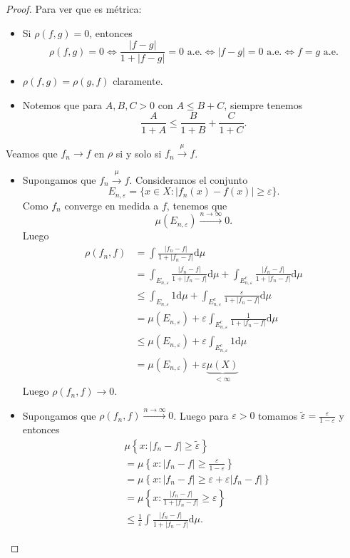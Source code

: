 \documentclass{article}
\theoremstyle{definition}
\theoremstyle{remark}
\numberwithin{equation}{section}
\renewcommand{\d}{\mathrm{d}}
\newcommand{\e}{\varepsilon}
\newcommand{\oo}{\infty}
\renewcommand{\tilde}{\widetilde}
\newcommand{\abs}[1]{\left| #1 \right|}
\newcommand{\set}[1]{\left\{ #1 \right\}}
\newcommand{\ds}{\displaystyle}
\begin{document}
\begin{proof}
  Para ver que es métrica:
  \begin{itemize}
    \item Si $\rho(f,g) = 0$, entonces 
    \[ \rho(f,g) = 0 \iff \frac{\abs{f-g}}{1 + \abs{f-g}} = 0 \text{ a.e.} \iff \abs{f-g} = 0 \text{ a.e.} \iff f = g \text{ a.e.} \]
    \item $\rho(f,g) = \rho(g,f)$ claramente.
    \item Notemos que para $A,B,C >0$ con $A \leq B + C$, siempre tenemos 
    \[ \frac{A}{1+A} \leq \frac{B}{1+B} + \frac{C}{1+C}. \]
  \end{itemize}
  Veamos que $f_n \to f$ en $\rho$ si y solo si $f_n \xrightarrow{\mu} f$.
  \begin{itemize}
    \item \boxed{\impliedby} Supongamos que $f_n \xrightarrow{\mu} f$. Consideramos el conjunto
    \[ E_{n,\e} = \{x \in X \colon \abs{f_n(x) - f(x)} \geq \e\}. \]
    Como $f_n$ converge en medida a $f$, tenemos que 
    \[ \mu(E_{n,\e}) \xrightarrow{n\to\oo} 0. \]
    Luego 
    \begin{align*}
        \rho(f_n,f)
        &= \int \frac{\abs{f_n - f}}{1 + \abs{f_n - f}} \d\mu \\
        &= \int_{E_{n,\e}} \frac{\abs{f_n - f}}{1 + \abs{f_n - f}} \d\mu + \int_{E_{n,\e}^c} \frac{\abs{f_n - f}}{1 + \abs{f_n - f}} \d\mu \\
        &\leq \int_{E_{n,\e}} 1 \d\mu + \int_{E_{n,\e}^c} \frac{\e}{1 + \abs{f_n - f}} \d\mu \\
        &= \mu(E_{n,\e}) + \e \int_{E_{n,\e}^c} \frac{1}{1 + \abs{f_n - f}} \d\mu \\
        &\leq \mu(E_{n,\e}) + \e \int_{E_{n,\e}^c} 1 \d\mu \\
        &= \mu(E_{n,\e}) + \e \underbrace{\mu(X)}_{<\oo}
    \end{align*}
    Luego $\rho(f_n,f) \to 0$.

    \item \boxed{\implies} Supongamos que $\rho(f_n,f) \xrightarrow{n\to\oo} 0$. Luego para $\e>0$ tomamos $\ds \tilde\e = \frac{\e}{1-\e}$ y entonces
    \begin{align*}
      &\mu\set{x \colon \abs{f_n - f} \geq \tilde\e} \\
      &= \mu\set{x \colon \abs{f_n - f} \geq \frac{\e}{1-\e}} \\
      &= \mu\set{x \colon \abs{f_n - f} \geq \e + \e \abs{f_n - f}} \\
      &= \mu\set{x \colon \frac{\abs{f_n - f}}{1 + \abs{f_n - f}} \geq \e} \\
      &\leq \frac{1}{\e} \int \frac{\abs{f_n - f}}{1 + \abs{f_n - f}} \d\mu.
    \end{align*} %
  \end{itemize}
\end{proof}
\end{document}
